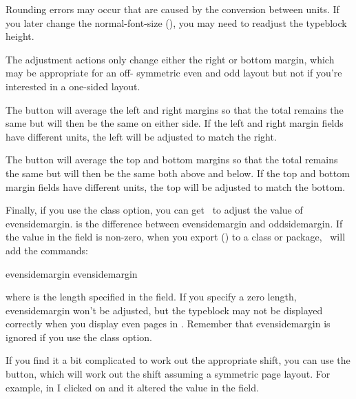 \begin{warning}
Rounding errors may occur that are caused by the conversion between
units. If you later change the \gls{normal-font-size}
(),
you may need to readjust the \gls{typeblock} height.
\end{warning}

The adjustment actions only change either the right or bottom
margin, which may be appropriate for an off-
symmetric even and odd layout but not if you're interested in a
one-sided  layout.

The  button will average the left
and right margins so that the total remains the same but will then
be the same on either side. If the left and right margin fields have
different units, the left will be adjusted to match the right.

The  button will average the top
and bottom margins so that the total remains the same but will then
be the same both above and below. If the top and bottom margin fields have
different units, the top will be adjusted to match the bottom.

Finally, if you use the  class option, you can get
\FlowframTk\ to adjust the value of \gls{evensidemargin}.
 is the difference between
\gls{evensidemargin} and \gls{oddsidemargin}. If the value
in the  field is non-zero, when you
export () to a class or package, 
\FlowframTk\ will add the commands:
\begin{compactcodebox}
\gls{evensidemargin}
\gls{evensidemargin}
\end{compactcodebox}%
where  is the length specified in the
 field. If you specify a zero
length, \gls{evensidemargin} won't be adjusted, but the
\gls{typeblock} may not be displayed correctly when you display even
pages in \FlowframTk. Remember that \gls{evensidemargin} is
ignored if you use the  class option.

If you find it a bit complicated to work out the appropriate shift,
you can use the  button,
which will work out the shift assuming a symmetric page layout. For
example, in  I clicked on
 and it altered the
value in the  field.

